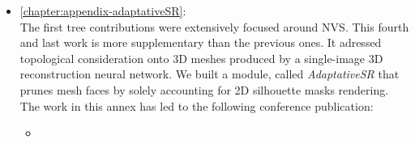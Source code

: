 \begin{itemize}
      \item \autoref{chapter:appendix-adaptativeSR}:  \\
      The first tree contributions were extensively focused around \ac{NVS}. This fourth and last work is more supplementary than the previous ones. It adressed topological consideration onto 3D meshes produced by a single-image 3D reconstruction neural network. We built a module, called \textit{AdaptativeSR} that prunes mesh faces by solely accounting for 2D silhouette masks rendering. The work in this annex has led to the following conference publication:
      \begin{itemize}
            \item {}
      \end{itemize}
\end{itemize}



